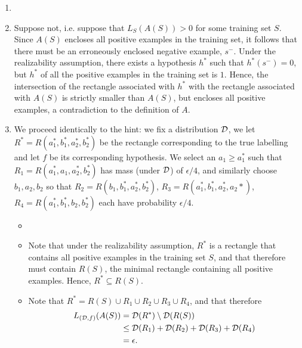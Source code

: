 \begin{ex}
  \begin{enumerate}
    \item[]
    \item Suppose not, i.e. suppose that $L_S(A(S))>0$ for some training set
          $S$. Since $A(S)$ encloses
          all positive examples in the training set, it follows that there must
          be an erroneously enclosed negative example, $s^-$. Under the
          realizability assumption, there exists a hypothesis $h^*$ such that
          $h^*(s^-)=0$, but $h^*$ of all the positive examples in the training
          set is $1$. Hence, the intersection of the rectangle associated
          with $h^*$ with the rectangle associated with $A(S)$ is strictly
          smaller than $A(S)$, but encloses all positive examples, a
          contradiction to the definition of $A$.
    \item We proceed identically to the hint: we fix a distribution $\mathcal{D}$, we let
          $R^*=R(a_1^*, b_1^*, a_2^*, b_2^*)$ be the rectangle corresponding to
          the true labelling and let $f$ be its corresponding hypothesis. We
          select an $a_1\geq a_1^*$ such that $R_1=R(a_1^*, a_1, a_2^*, b_2^*)$
          has mass (under $\mathcal{D}$) of $\epsilon/4$, and similarly choose
          $b_1, a_2, b_2$ so that
          $R_2=R(b_1, b_1^*, a_2^*, b_2^*)$,
          $R_3=R(a_1^*, b_1^*, a_2^*, a_2*)$,
          $R_4=R(a_1^*, b_1^*, b_2, b_2^*)$ each have probability $\epsilon/4$.
          \begin{itemize}
            \item []
            \item Note that under the realizability assumption,
                  $R^*$ is a rectangle that contains all positive
                  examples in the training set $S$, and that therefore must
                  contain $R(S)$, the minimal rectangle containing all positive
                  examples. Hence, $R^*\subseteq R(S)$.
            \item Note that $R^*=R(S)\cup R_1\cup R_2\cup R_3\cup R_4$, and that
                  therefore
                  \begin{align*}
                    L_{(\mathcal{D},f)}(A(S))
                     & =\mathcal{D}(R^*)\setminus \mathcal{D}(R(S))                 \\
                     & \leq \mathcal{D}(R_1) + \mathcal{D}(R_2) + \mathcal{D}(R_3) + \mathcal{D}(R_4) \\
                     & =\epsilon.
                  \end{align*}

\end{itemize}
\end{enumerate}
\end{ex}
